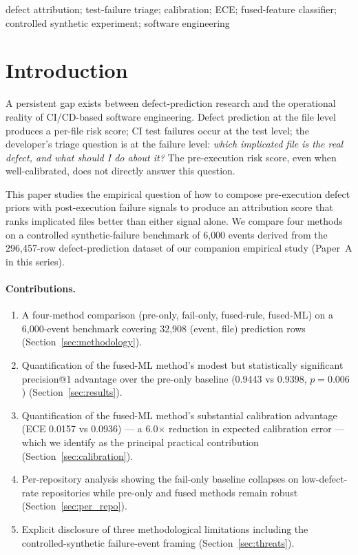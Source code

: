 \documentclass[conference]{IEEEtran}
\begin{document}
\begin{IEEEkeywords}
defect attribution; test-failure triage;
calibration; ECE; fused-feature classifier; controlled synthetic
experiment; software engineering
\end{IEEEkeywords}

\section{Introduction}
\label{sec:intro}
\FloatBarrier

A persistent gap exists between defect-prediction research and the
operational reality of CI/CD-based software engineering. Defect
prediction at the file level produces a per-file risk score; CI
test failures occur at the test level; the developer's triage
question is at the failure level: \emph{which implicated file is the
real defect, and what should I do about it?} The pre-execution risk
score, even when well-calibrated, does not directly answer this
question.

This paper studies the empirical question of how to compose
pre-execution defect priors with post-execution failure signals to
produce an attribution score that ranks implicated files better than
either signal alone. We compare four methods on a controlled
synthetic-failure benchmark of 6{,}000 events derived from the
296{,}457-row defect-prediction dataset of our companion empirical
study (Paper~A in this series).

\paragraph{Contributions.}

\begin{enumerate}
  \item A four-method comparison (pre-only, fail-only, fused-rule,
        fused-ML) on a 6{,}000-event benchmark covering 32{,}908
        (event, file) prediction rows
        (Section~\ref{sec:methodology}).
  \item Quantification of the fused-ML method's modest but
        statistically significant precision@1 advantage over the
        pre-only baseline (0.9443 vs 0.9398, $p = 0.006$)
        (Section~\ref{sec:results}).
  \item Quantification of the fused-ML method's substantial
        calibration advantage (ECE 0.0157 vs 0.0936) ---
        a 6.0$\times$ reduction in expected calibration error ---
        which we identify as the principal practical contribution
        (Section~\ref{sec:calibration}).
  \item Per-repository analysis showing the fail-only baseline
        collapses on low-defect-rate repositories while pre-only and
        fused methods remain robust (Section~\ref{sec:per_repo}).
  \item Explicit disclosure of three methodological limitations
        including the controlled-synthetic failure-event framing
        (Section~\ref{sec:threats}).
\end{enumerate}
\end{document}
